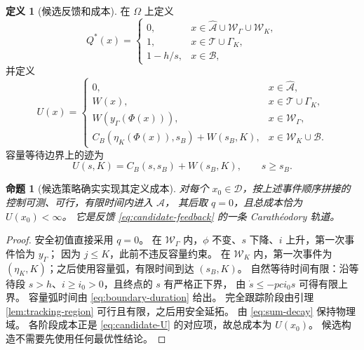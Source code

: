 \documentclass[11pt,a4paper,UTF8]{ctexart}
\newtheorem{proposition}[theorem]{命题}
\theoremstyle{definition}
\newtheorem{definition}[theorem]{定义}
\newcommand{\Acal}{\mathcal A}
\newcommand{\Dcal}{\mathcal D}
\begin{document}
\begin{definition}[候选反馈和成本]
\label{def:candidate}
在 $\Omega$ 上定义
\begin{equation}
Q^*(x)=
\begin{cases}
0,&x\in\widehat{\Acal}\cup\mathcal W_\Gamma\cup\mathcal W_K,\\
1,&x\in\mathcal T\cup\Gamma_K,\\
1-h/s,&x\in\mathcal B,
\end{cases}
\label{eq:candidate-feedback}
\end{equation}
并定义
\begin{equation}
U(x)=
\begin{cases}
0,&x\in\widehat{\Acal},\\
W(x),&x\in\mathcal T\cup\Gamma_K,\\
W(y_\Gamma(\Phi(x))),&x\in\mathcal W_\Gamma,\\
C_B(\eta_K(\Phi(x)),s_B)+W(s_B,K),&x\in\mathcal W_K\cup\mathcal B.
\end{cases}
\label{eq:candidate-U}
\end{equation}
容量等待边界上的迹为
\begin{equation}
U(s,K)=C_B(s,s_B)+W(s_B,K),\qquad s\ge s_B.
\label{eq:boundary-value}
\end{equation}
\end{definition}

\begin{proposition}[候选策略确实实现其定义成本]
\label{prop:candidate-attainment}
对每个 $x_0\in\Dcal$，按上述事件顺序拼接的控制可测、可行，有限时间内进入 $\Acal$，
其后取 $q=0$，且总成本恰为 $U(x_0)<\infty$。
它是反馈 \eqref{eq:candidate-feedback} 的一条 Carath\'eodory 轨道。
\end{proposition}
\begin{proof}
安全初值直接采用 $q=0$。
在 $\mathcal W_\Gamma$ 内，$\phi$ 不变、$s$ 下降、$i$ 上升，第一次事件恰为 $y_\Gamma$；
因为 $j\le K$，此前不违反容量约束。
在 $\mathcal W_K$ 内，第一次事件为 $(\eta_K,K)$；之后使用容量弧，有限时间到达 $(s_B,K)$。
自然等待时间有限：沿等待段 $s>h$、$i\ge i_0>0$，且终点的 $s$ 有严格正下界，
由 $\dot s\le-pci_0s$ 可得有限上界。
容量弧时间由 \eqref{eq:boundary-duration} 给出。
完全跟踪阶段由引理\ref{lem:tracking-region} 可行且有限，之后用安全延拓。
由 \eqref{eq:sum-decay} 保持物理域。
各阶段成本正是 \eqref{eq:candidate-U} 的对应项，故总成本为 $U(x_0)$。
候选构造不需要先使用任何最优性结论。
\end{proof}
\end{document}
